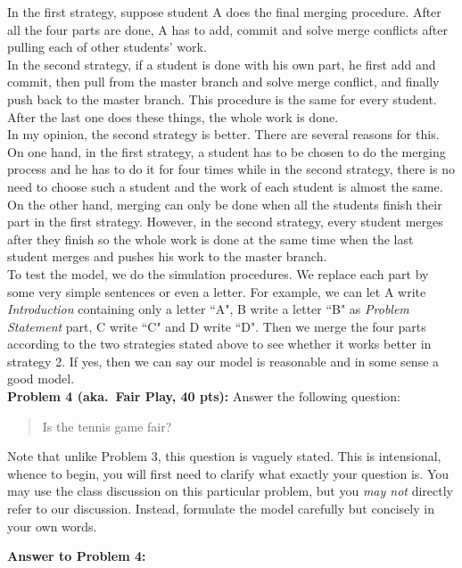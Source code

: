 \documentclass[12pt]{article}
\begin{document}
In the first strategy, suppose student A does the final merging procedure. After all the four parts are done, A has to add, commit and solve merge conflicts after pulling each of other students' work.\\

In the second strategy, if a student is done with his own part, he first add and commit, then pull from the master branch and solve merge conflict, and finally push back to the master branch. This procedure is the same for every student. After the last one does these things, the whole work is done.\\

In my opinion, the second strategy is better. There are several reasons for this. On one hand, in the first strategy, a student has to be chosen to do the merging process and he has to do it for four times while in the second strategy, there is no need to choose such a student and the work of each student is almost the same. On the other hand, merging can only be done when all the students finish their part in the first strategy. However, in the second strategy, every student merges after they finish so the whole work is done at the same time when the last student merges and pushes his work to the master branch.\\

To test the model, we do the simulation procedures. We replace each part by some very simple sentences or even a letter. For example, we can let A write \emph{Introduction} containing only a letter ``A", B write a letter ``B" as \emph{Problem Statement} part, C write ``C" and D write ``D". Then we merge the four parts according to the two strategies stated above to see whether it works better in strategy 2. If yes, then we can say our model is reasonable and in some sense a good model.\\


\newpage
\vskip0.25in
\noindent\textbf{Problem 4 (aka.\ Fair Play, 40 pts):}
Answer the following question:
\begin{verse}
Is the tennis game fair?
\end{verse}
Note that unlike Problem 3, this question is vaguely stated.
This is intensional, whence to begin, you will first need to clarify
what exactly your question is.
You may use the class discussion on this particular 
problem, but you \emph{may not} directly refer to our 
discussion.  Instead, formulate the model carefully but concisely in 
your own words.   

\newpage
\noindent\textbf{Answer to Problem 4:}\\
\end{document}
